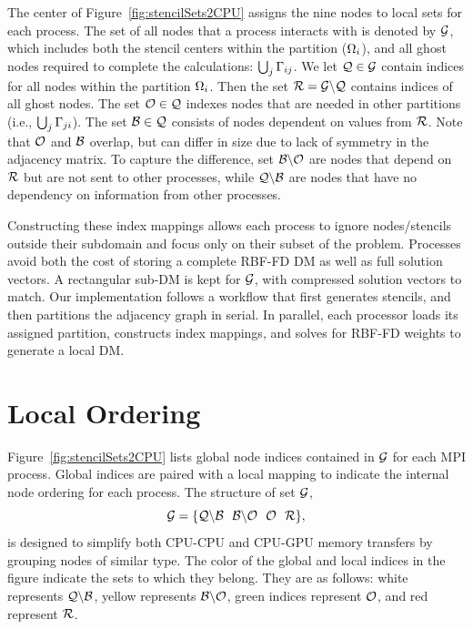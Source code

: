 \documentclass{report}
\begin{document}
        
       
The center of Figure~\ref{fig:stencilSets2CPU} assigns the nine nodes to local sets for each process. The set of all nodes that a process interacts with is denoted by $\mathcal{G}$, which includes both the stencil centers within the partition ($\Omega_i$), and all ghost nodes required to complete the calculations: $\bigcup_{j} \Gamma_{ij}$.  
We let $\mathcal{Q}\in\mathcal{G}$ contain indices for all nodes within the partition $\Omega_i$. 
Then the set $\mathcal{R} = \mathcal{G} \backslash \mathcal{Q}$ contains indices of all ghost nodes. 
The set $\mathcal{O}\in\mathcal{Q}$ indexes nodes that are needed in other partitions (i.e., $\bigcup_j \Gamma_{ji}$). The set $\mathcal{B}\in\mathcal{Q}$ consists of nodes dependent on values from $\mathcal{R}$. Note that $\mathcal{O}$ and $\mathcal{B}$ overlap, but can differ in size due to lack of symmetry in the adjacency matrix. To capture the difference, set $\mathcal{B} \backslash \mathcal{O}$ are nodes that depend on $\mathcal{R}$ but are not sent to other processes, while $\mathcal{Q} \backslash \mathcal{B}$ are nodes that have no dependency on information from other processes.

Constructing these index mappings allows each process to ignore nodes/stencils outside their subdomain and focus only on their subset of the problem. Processes avoid both the cost of storing a complete RBF-FD DM as well as full solution vectors. A rectangular sub-DM is kept for $\mathcal{G}$, with compressed solution vectors to match. Our implementation follows a workflow that first generates stencils, and then partitions the adjacency graph in serial. In parallel, each processor loads its assigned partition, constructs index mappings, and solves for RBF-FD weights to generate a local DM.  

\section{Local Ordering}

Figure~\ref{fig:stencilSets2CPU} lists global node indices contained in $\mathcal{G}$ for each MPI process. Global indices are paired with a local mapping to indicate the internal node ordering for each process. The structure of set $\mathcal{G}$,
   \begin{equation}
 		\setAllNodes = \{ \mathcal{Q}\backslash\mathcal{B} \ \ \mathcal{B}\backslash\mathcal{O} \ \ \mathcal{O} \ \ \setDepend \},
            \label{eq:decompose_g}
        \end{equation}
 is designed to simplify both CPU-CPU and CPU-GPU memory transfers by grouping nodes of similar type. The color of the global and local indices in the figure
 indicate the sets to which they belong. They are as follows: white represents $\mathcal{Q} \backslash \mathcal{B}$, 
 yellow represents $\mathcal{B} \backslash \mathcal{O}$, green indices 
 represent $\mathcal{O}$, and red represent $\mathcal{R}$.  
\end{document}
